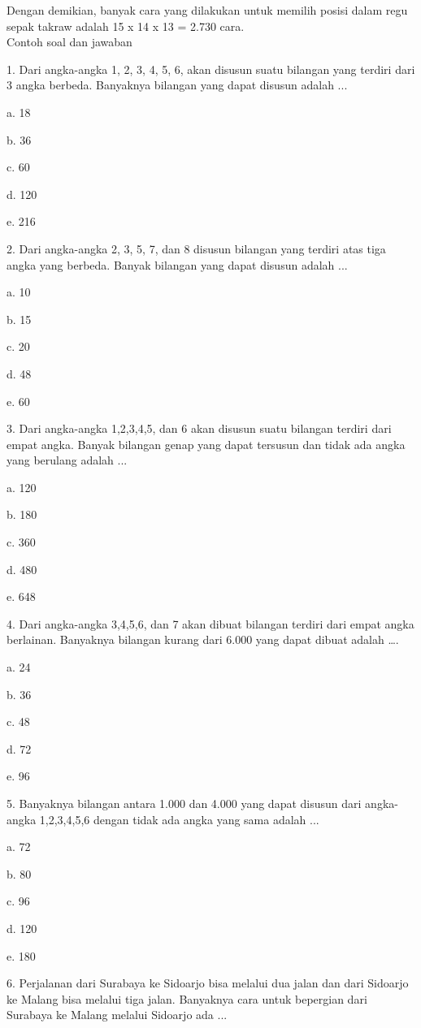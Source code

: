 \documentclass[11pt,fleqn]{book} %
\begin{document}
Dengan demikian, banyak cara yang dilakukan untuk memilih posisi dalam regu sepak takraw adalah 15 x 14 x 13 = 2.730 cara.\\

 
Contoh soal dan jawaban

1. Dari angka-angka 1, 2, 3, 4, 5, 6, akan disusun suatu bilangan yang terdiri dari 3 angka berbeda. Banyaknya bilangan yang dapat disusun adalah ... 

a.	18

b.	36

c.	60

d.	120

e.	216



2. Dari angka-angka 2, 3, 5, 7, dan 8 disusun bilangan yang terdiri atas tiga angka yang berbeda. Banyak bilangan yang dapat disusun adalah ... 

a.	10

b.	15

c.	20

d.	48

e.	60


3. Dari angka-angka 1,2,3,4,5, dan 6 akan disusun suatu bilangan terdiri dari empat angka. Banyak bilangan genap yang dapat tersusun dan tidak ada angka yang berulang adalah ... 

a.	120

b.	180

c.	360

d.	480

e.	648 


4. Dari angka-angka 3,4,5,6, dan 7 akan dibuat bilangan terdiri dari empat angka berlainan. Banyaknya bilangan kurang dari 6.000 yang dapat dibuat adalah …. 

a.	24

b.	36

c.	48

d.	72

e.	96


5. Banyaknya bilangan antara 1.000 dan 4.000 yang dapat disusun dari angka-angka 1,2,3,4,5,6 dengan tidak ada angka yang sama adalah ... 

a.	72

b.	80

c.	96

d.	120

e.	180


6. Perjalanan dari Surabaya ke Sidoarjo bisa melalui dua jalan dan dari Sidoarjo ke Malang bisa melalui tiga jalan. Banyaknya cara untuk bepergian dari Surabaya ke Malang melalui Sidoarjo ada ... 
\end{document}
